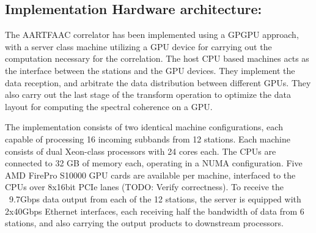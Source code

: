 \documentclass{ws-jai}
\begin{document}
\subsection  {Implementation  Hardware  architecture:} 
The AARTFAAC  correlator has  been implemented  using a  GPGPU approach,  with a
server class  machine utilizing a  GPU device  for carrying out  the computation
necessary  for  the correlation.   The  host  CPU  based  machines acts  as  the
interface between  the stations and  the GPU  devices.  They implement  the data
reception, and arbitrate the data distribution between different GPUs. They also
carry out the last stage of the  transform operation to optimize the data layout
for computing the spectral coherence on a GPU.




The  implementation  consists  of  two identical  machine  configurations,  each
capable  of processing  16  incoming  subbands from  12  stations. Each  machine
consists  of  dual Xeon-class  processors  with  24  cores  each. The  CPUs  are
connected to 32 GB  of memory each, operating in a  NUMA configuration. Five AMD
FirePro S10000 GPU cards are available  per machine, interfaced to the CPUs over
8x16bit  PCIe lanes  (TODO: Verify  correctness). To  receive the  ~9.7Gbps data
output  from each  of the  12  stations, the  server is  equipped with  2x40Gbps
Ethernet interfaces, each receiving half the  bandwidth of data from 6 stations,
and also carrying the output products to downstream processors.\\
\end{document}
